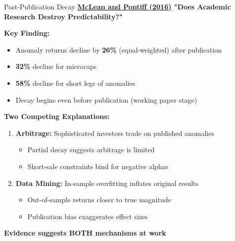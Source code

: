 \documentclass{beamer}
\begin{document}
\begin{frame}{Post-Publication Decay}
    \textbf{\textcolor{blue}{\href{https://doi.org/10.1111/jofi.12365}{McLean and Pontiff (2016)}} "Does Academic Research Destroy Predictability?"}
    
    
    \textbf{Key Finding:}
    \begin{itemize}
        \item Anomaly returns decline by \textbf{26\%} (equal-weighted) after publication
        \item \textbf{32\%} decline for microcaps
        \item \textbf{58\%} decline for short legs of anomalies
        \item Decay begins even before publication (working paper stage)
    \end{itemize}
    
    
    \textbf{Two Competing Explanations:}
    \begin{enumerate}
        \item \textbf{Arbitrage:} Sophisticated investors trade on published anomalies
        \begin{itemize}
            \item Partial decay suggests arbitrage is limited
            \item Short-sale constraints bind for negative alphas
        \end{itemize}
        
        \item \textbf{Data Mining:} In-sample overfitting inflates original results
        \begin{itemize}
            \item Out-of-sample returns closer to true magnitude
            \item Publication bias exaggerates effect sizes
        \end{itemize}
    \end{enumerate}
    
    
    \textbf{Evidence suggests BOTH mechanisms at work}
\end{frame}
\end{document}
